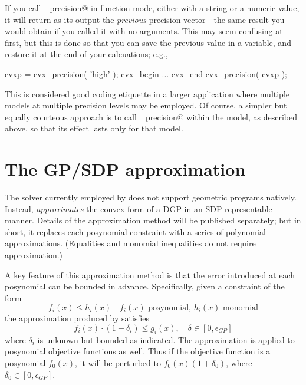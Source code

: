 \documentclass[12pt]{article}
\begin{document}
If you call \verb@cvx_precision@ in function mode, either with a string or a numeric
value, it will return as its output the \emph{previous} precision vector---the same
result you would obtain if you called it with no arguments. This may
seem confusing at first, but this is done so that you can save the previous value
in a variable, and restore it at the end of your calcuations; e.g.,
\begin{code}
	cvxp = cvx_precision( 'high' );
	cvx_begin
		...
	cvx_end
	cvx_precision( cvxp );
\end{code}
This is considered good coding etiquette in a larger application where multiple 
\cvx models at multiple precision levels may be employed. Of course, a simpler but
equally courteous approach is to call \verb@cvx_precision@ within the \cvx
model, as described above, so that its effect lasts only for that model.

\section{The GP/SDP approximation}
\label{sec:gp-approx}

The solver currently employed by \cvx does not support geometric programs natively.
Instead, \cvx \emph{approximates} the convex form of a DGP in an SDP-representable
manner. Details of the approximation method will be published separately; but in short,
it replaces each posynomial constraint with a series of polynomial
approximations. (Equalities and monomial inequalities do not require approximation.)

A key feature of this approximation method is that the error introduced at
each posynomial can be bounded in advance. Specifically,
given a constraint of the form
\begin{equation}
	\label{eq:constr-gp}
	f_i(x) \leq h_i(x) \quad f_i(x)\text{ posynomial, }h_i(x)\text{ monomial}
\end{equation}
the approximation produced by \cvx satisfies
\begin{equation}
	\label{eq:constr-approx}
	f_i(x) \cdot ( 1 + \delta_i ) \leq g_i(x), \quad \delta\in[0,\epsilon_{GP}]
\end{equation}
where $\delta_i$ is unknown but bounded as indicated.
The approximation is applied to posynomial objective functions as well. Thus
if the objective function is a posynomial $f_0(x)$, it will be perturbed to
$f_0(x)(1+\delta_0)$, where $\delta_0\in[0,\epsilon_{GP}]$. 
\end{document}
